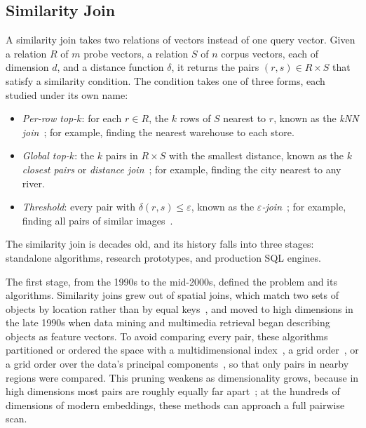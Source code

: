 \subsection{Similarity Join}\label{subsec:vector-join}

A similarity join takes two relations of vectors instead of one query vector.
Given a relation $R$ of $m$ probe vectors, a relation $S$ of $n$ corpus vectors, each of dimension $d$, and a distance function $\delta$, it returns the pairs $(r, s) \in R \times S$ that satisfy a similarity condition.
The condition takes one of three forms, each studied under its own name:
\begin{itemize}
    \item \emph{Per-row top-$k$}: for each $r \in R$, the $k$ rows of $S$ nearest to $r$, known as the \emph{kNN join}~\cite{BohmKrebsKNNJoin04}; for example, finding the nearest warehouse to each store.
    \item \emph{Global top-$k$}: the $k$ pairs in $R \times S$ with the smallest distance, known as the \emph{$k$ closest pairs} or \emph{distance join}~\cite{HjaltasonSametDistJoin98, CorralClosestPair00}; for example, finding the city nearest to any river.
    \item \emph{Threshold}: every pair with $\delta(r, s) \le \varepsilon$, known as the \emph{$\varepsilon$-join}~\cite{ShimSimJoin97, KoudasSevcik98}; for example, finding all pairs of similar images~\cite{ShimSimJoin97}.
\end{itemize}

The similarity join is decades old, and its history falls into three stages: standalone algorithms, research prototypes, and production SQL engines.

The first stage, from the 1990s to the mid-2000s, defined the problem and its algorithms.
Similarity joins grew out of spatial joins, which match two sets of objects by location rather than by equal keys~\cite{BrinkhoffSpatialJoin93}, and moved to high dimensions in the late 1990s when data mining and multimedia retrieval began describing objects as feature vectors.
To avoid comparing every pair, these algorithms partitioned or ordered the space with a multidimensional index~\cite{ShimSimJoin97}, a grid order~\cite{BohmEGO01}, or a grid order over the data's principal components~\cite{XiaGorder04}, so that only pairs in nearby regions were compared.
This pruning weakens as dimensionality grows, because in high dimensions most pairs are roughly equally far apart~\cite{BeyerNNMeaningful99}; at the hundreds of dimensions of modern embeddings, these methods can approach a full pairwise scan.

